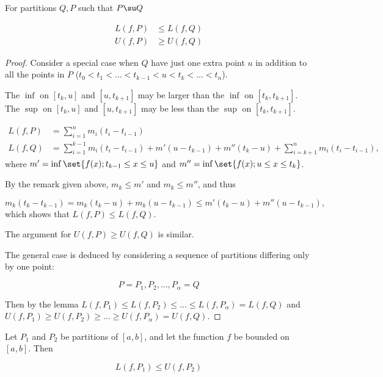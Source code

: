 \documentclass[11pt]{scrartcl}
\begin{document}
\begin{lemma*}
  For partitions \(Q, P\) such that \(P \su Q\)

  \begin{align*}
    L(f, P) &\leq L(f, Q)\\
    U(f, P) &\geq U(f, Q)
  \end{align*}

\end{lemma*}

\begin{proof}

  Consider a special case when \(Q\) have just one extra point \(u\)
  in addition to all the points in \(P\)
  (\(t_{0} < t_{1} < \dots < t_{k-1} < u < t_{k} < \dots < t_{n} \)).

  \begin{note*}
    The \(\inf\) on \([t_{k}, u]\) and \([u, t_{k+1}]\) may be larger than the \(\inf\) on \([t_{k},t_{k+1}]\).\\
    The \(\sup\) on \([t_{k}, u]\) and \([u, t_{k+1}]\) may be less than the \(\sup\) on \([t_{k},t_{k+1}]\).
  \end{note*}
\begin{align}
  L(f, P) &= \sum_{i=1}^{n}m_{i}(t_{i} - t_{i-1})\\
  L(f, Q)  &= \sum_{i=1}^{k-1}m_{i}(t_{i} - t_{i-1}) + m'(u-t_{k-1}) + m''(t_{k} - u) +  \sum_{i=k+1}^{n}m_{i}(t_{i} - t_{i-1}),
\end{align}
where \(m' = \inf\set{f(x); t_{k-1} \leq x \leq u}\) and \(m'' = \inf\set{f(x); u \leq x \leq t_{k}}\).

By the remark given above, \(m_{k} \leq m'\) and \(m_{k} \leq m''\), and thus


\begin{equation*}
m_{k}(t_{k} - t_{k-1}) = m_{k}(t_{k} - u) + m_{k}(u - t_{k-1}) \leq m'(t_{k} - u) + m''(u-t_{k-1}),
\end{equation*}
which shows that \(L(f, P) \leq L(f, Q)\).

The argument for \(U(f, P) \geq U(f, Q)\) is similar.

The general case is deduced by considering a sequence of partitions
differing only by one point:


\begin{equation*}
P=P_{1}, P_{2}, \dots, P_{\alpha} = Q
\end{equation*}

Then by the lemma
\(L(f, P_{1}) \leq L(f, P_{2}) \leq \dots \leq L(f, P_{\alpha}) = L(f,
Q)\) and
\(U(f, P_{1}) \geq U(f, P_{2}) \geq \dots \geq U(f, P_{\alpha}) = U(f, Q)\).
\end{proof}
\begin{theorem}
  \label{sec:1}
  Let \(P_{1}\) and \(P_{2}\) be partitions of \([a, b]\), and let the
  function \(f\) be bounded on \([a, b]\). Then


  \begin{equation*}
    L(f, P_{1}) \leq U(f, P_{2})
  \end{equation*}

\end{theorem}
\end{document}
